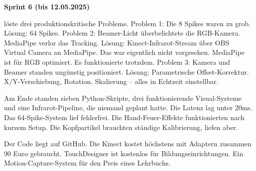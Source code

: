 \textbf{Sprint 6 (bis 12.05.2025)} \raggedright löste drei produktionskritische Probleme. Problem 1: Die 8 Spikes waren zu grob. Lösung: 64 Spikes. Problem 2: Beamer-Licht überbelichtete die RGB-Kamera. MediaPipe verlor das Tracking. Lösung: Kinect-Infrarot-Stream über OBS Virtual Camera an MediaPipe. Das war eigentlich nicht vorgesehen. MediaPipe ist für RGB optimiert. Es funktionierte trotzdem. Problem 3: Kamera und Beamer standen ungünstig positioniert. Lösung: Parametrische Offset-Korrektur. X/Y-Verschiebung, Rotation, Skalierung – alles in Echtzeit einstellbar.

Am Ende standen sieben Python-Skripte, drei funktionierende Visual-Systeme und eine Infrarot-Pipeline, die niemand geplant hatte. Die Latenz lag unter 20ms. Das 64-Spike-System lief fehlerfrei. Die Hand-Feuer-Effekte funktionierten nach kurzem Setup. Die Kopfpartikel brauchten ständige Kalibrierung, liefen aber.

Der Code liegt auf GitHub. Die Kinect kostet höchstens mit Adaptern zusammen 90 Euro gebraucht. TouchDesigner ist kostenlos für Bildungseinrichtungen. Ein Motion-Capture-System für den Preis eines Lehrbuchs.